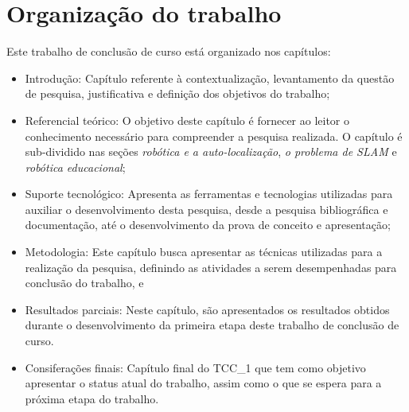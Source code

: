 	\section{Organização do trabalho} %
	\label{sec:organização_do_trabalho}
		Este trabalho de conclusão de curso está organizado nos capítulos:
		\begin{itemize}
			\item Introdução: Capítulo referente à contextualização, levantamento da questão de pesquisa, justificativa e definição dos objetivos do trabalho;

			\item Referencial teórico: O objetivo deste capítulo é fornecer ao leitor o conhecimento necessário para compreender a pesquisa realizada. O capítulo é sub-dividido nas seções \textit{robótica e a auto-localização},  \textit{o problema de SLAM} e \textit{robótica educacional};

			\item Suporte tecnológico: Apresenta as ferramentas e tecnologias utilizadas para auxiliar o desenvolvimento desta pesquisa, desde a pesquisa bibliográfica e documentação, até o desenvolvimento da prova de conceito e apresentação;

			\item Metodologia: Este capítulo busca apresentar as técnicas utilizadas para a realização da pesquisa, definindo as atividades a serem desempenhadas para conclusão do trabalho, e

			\item Resultados parciais: Neste capítulo, são apresentados os resultados obtidos durante o desenvolvimento da primeira etapa deste trabalho de conclusão de curso.

			\item Consiferações finais: Capítulo final do TCC\_1 que tem como objetivo apresentar o status atual do trabalho, assim como o que se espera para a próxima etapa do trabalho.
		\end{itemize}
